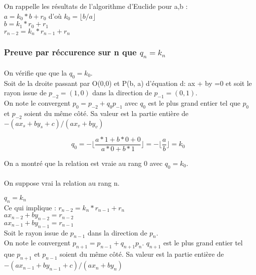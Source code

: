 On rappelle les résultats de l'algorithme d'Euclide pour a,b : \\
\noindent $a       = k_0*b       + r_0$ d'où $k_0 = \lfloor b / a \rfloor$\\
\noindent $b       = k_1*r_0     + r_1$\\
\noindent $r_{n-2} = k_n*r_{n-1} + r_{n}$\\

\subsubsection{Preuve par réccurence sur n que $q_n = k_n$}

\paragraph{}

On vérifie que que la $q_0 = k_0$.\\

Soit de la droite passant par O(0,0) et P(b, a) d'équation d: ax + by =0 et soit le rayon issue de $p_{-2} = (1,0)$ dans la direction de $p_{-1} = (0,1)$.\\

On note le convergent $p_{0} = p_{-2} + q_0 p_{-1}$ avec $q_0$ est le plus grand entier tel que $p_0$ et $p_{-2}$ soient du même côté. Sa valeur est la partie entière de $-(a x_s + b y_s +c)/(a x_v + b y_v)$

$$q_0 = - \lfloor\frac{a*1 + b*0 +0}{a*0 + b*1}\rfloor = - \lfloor\frac{a}{b}\rfloor = k_0$$

On a montré que la relation est vraie au rang 0 avec \textbf{$q_0 = k_0$}.

\paragraph{}
On suppose vrai la relation au rang n.

$q_n = k_n$\\

Ce qui implique :  
$r_{n-2} = k_n*r_{n-1} + r_{n}$\\
$a x_{n-2} + b y_{n-2} = r_{n-2}$\\
$a x_{n-1} + b y_{n-1} = r_{n-1}$\\

Soit le rayon issue de $p_{n-1}$ dans la direction de $p_{n}$.\\
On note le convergent $p_{n+1} = p_{n-1} + q_{n+1} p_{n}$. $q_{n+1}$ est le plus grand entier tel que $p_{n+1}$ et $p_{n-1}$ soient du même côté. Sa valeur est la partie entière de $-(a x_{n-1} + b y_{n-1} +c)/(a x_{n} + b y_{n})$


